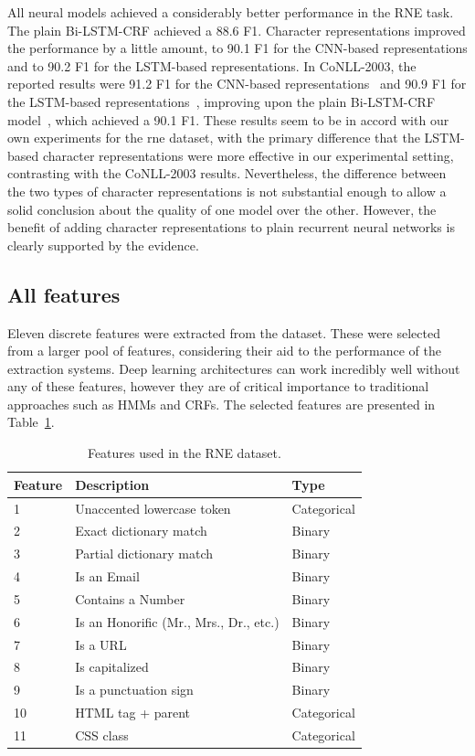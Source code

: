 \documentclass{nle}
\begin{document}
All neural models achieved a considerably better performance in the RNE task. The plain Bi-LSTM-CRF
achieved a 88.6 F1. Character representations improved the performance by a little amount,
to 90.1 F1 for the CNN-based representations and to 90.2 F1 for the LSTM-based
representations. In CoNLL-2003, the reported results were 91.2 F1 for the CNN-based
representations~\cite{Ma2016} and 90.9 F1 for the LSTM-based representations~\cite{Lample2016}, improving
upon the plain Bi-LSTM-CRF model~\cite{Huang2015}, which achieved a 90.1 F1. These results seem to be in
accord with our own experiments for the \gls{rne} dataset, with the primary difference that the
LSTM-based character representations were more effective in our experimental setting,
contrasting with the CoNLL-2003 results.
Nevertheless, the difference between the two types of character representations 
is not substantial enough to allow a solid conclusion about the quality of
one model over the other. However, the benefit of adding character representations 
to plain recurrent neural networks is clearly supported by the evidence.


\subsection{All features}
\label{ssec:exp_2}

Eleven discrete features were extracted from the dataset. 
These were selected from a larger pool of features, 
considering their aid to the performance of the extraction systems. Deep learning 
architectures can work incredibly well without any of these features, however they
are of critical importance to traditional approaches such as HMMs and CRFs. 
The selected features are presented in Table~\ref{tab:features}. 

\begin{table}[h]
  \small
  \begin{center}
    \begin{tabular}{ lll }
      \toprule
      Feature & Description & Type \\
      \midrule
      1  & Unaccented lowercase token & Categorical \\
      2  & Exact dictionary match & Binary \\
      3  & Partial dictionary match & Binary \\
      4  & Is an Email & Binary \\
      5  & Contains a Number & Binary \\
      6  & Is an Honorific (Mr., Mrs., Dr., etc.) & Binary \\
      7  & Is a URL & Binary \\
      8  & Is capitalized & Binary \\
      9  & Is a punctuation sign & Binary \\
      10 & HTML tag + parent & Categorical \\
      11 & CSS class & Categorical \\
      \bottomrule
    \end{tabular}
  \end{center}
  \caption{Features used in the RNE dataset.}
  \label{tab:features}
\end{table}
\end{document}

